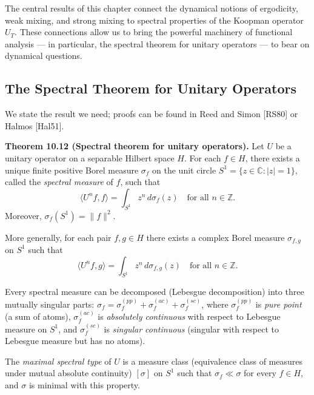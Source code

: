 The central results of this chapter connect the dynamical notions of ergodicity, weak mixing, and strong mixing to spectral properties of the Koopman operator $U_T$. These connections allow us to bring the powerful machinery of functional analysis --- in particular, the spectral theorem for unitary operators --- to bear on dynamical questions.

\subsection{The Spectral Theorem for Unitary Operators}\label{sec:10.5.1}

We state the result we need; proofs can be found in Reed and Simon [RS80] or Halmos [Hal51].

\textbf{Theorem 10.12 (Spectral theorem for unitary operators).} Let $U$ be a unitary operator on a separable Hilbert space $H$. For each $f \in H$, there exists a unique finite positive Borel measure $\sigma_f$ on the unit circle $S^1 = \{z \in \mathbb{C} : |z| = 1\}$, called the \textit{spectral measure} of $f$, such that
\begin{equation}\label{eq:10.5}\tag{10.5}
\langle U^n f, f \rangle = \int_{S^1} z^n \, d\sigma_f(z) \quad \text{for all } n \in \mathbb{Z}.
\end{equation}
Moreover, $\sigma_f(S^1) = \|f\|^2$.

More generally, for each pair $f, g \in H$ there exists a complex Borel measure $\sigma_{f,g}$ on $S^1$ such that
\begin{equation}\label{eq:10.6}\tag{10.6}
\langle U^n f, g \rangle = \int_{S^1} z^n \, d\sigma_{f,g}(z) \quad \text{for all } n \in \mathbb{Z}.
\end{equation}

Every spectral measure can be decomposed (Lebesgue decomposition) into three mutually singular parts: $\sigma_f = \sigma_f^{(pp)} + \sigma_f^{(ac)} + \sigma_f^{(sc)}$, where $\sigma_f^{(pp)}$ is \textit{pure point} (a sum of atoms), $\sigma_f^{(ac)}$ is \textit{absolutely continuous} with respect to Lebesgue measure on $S^1$, and $\sigma_f^{(sc)}$ is \textit{singular continuous} (singular with respect to Lebesgue measure but has no atoms).

\begin{definition}\label{def:10.13.}
The \textit{maximal spectral type} of $U$ is a measure class (equivalence class of measures under mutual absolute continuity) $[\sigma]$ on $S^1$ such that $\sigma_f \ll \sigma$ for every $f \in H$, and $\sigma$ is minimal with this property.
\end{definition}


